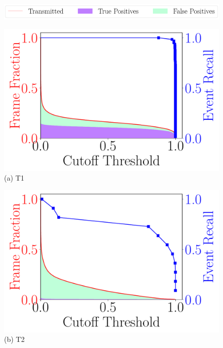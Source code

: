 \begin{figure}
    \centering
    \includegraphics[width=\linewidth]{FIGS/fig-event-recall-frame-percentage-legend.pdf}\\
    \vspace{.5in}
    \begin{minipage}[]{0.45\linewidth}
        \centering
        \includegraphics[width=\linewidth]{FIGS/fig-event-recall-frame-percentage-vs-threshold-okutama.pdf}\\
        {(a) T1}
    \end{minipage}
    \begin{minipage}[]{0.45\linewidth}
        \centering
        \includegraphics[width=\linewidth]{FIGS/fig-event-recall-frame-percentage-vs-threshold-stanford.pdf}\\
        {(b) T2}
    \end{minipage}


\end{figure}

